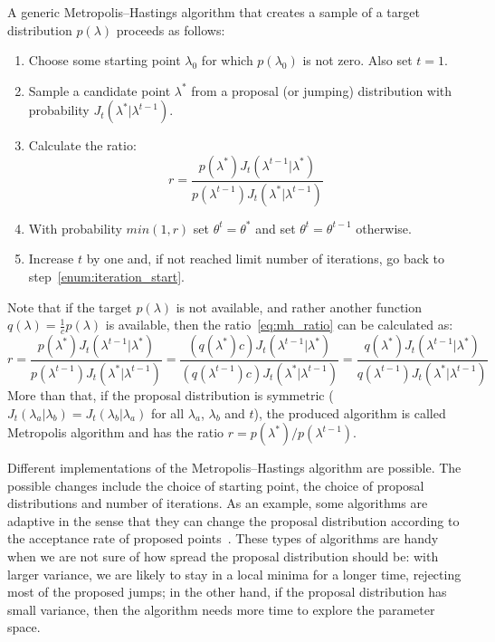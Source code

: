 A generic Metropolis--Hastings algorithm that creates a sample of a 
target distribution $p (\lambda)$ proceeds as follows:
\begin{enumerate}
\item{Choose some starting point $\lambda_0$ for which $p (\lambda_0)$ 
    is not zero. Also set $t = 1$.}
\item{Sample a candidate point $\lambda^*$ from a proposal (or jumping) 
    distribution with probability $J_t (\lambda^* | \lambda^{t - 1})$.}
    \label{enum:iteration_start}
\item{Calculate the ratio:}
    \begin{equation}
        r = \frac{p (\lambda^*) J_t (\lambda^{t - 1} | \lambda^*)}
                 {p (\lambda^{t - 1}) J_t (\lambda^* | \lambda^{t - 1})}
        \label{eq:mh_ratio}
    \end{equation}
\item{With probability $min (1, r)$ set $\theta^t = \theta^*$ and set
    $\theta^t = \theta^{t - 1}$ otherwise.}
\item{Increase $t$ by one and, if not reached limit number of 
    iterations, go back to step~\ref{enum:iteration_start}.}
\end{enumerate}
Note that if the target $p (\lambda)$ is not available, and rather 
another function $q (\lambda) = \frac{1}{c}p(\lambda)$ is available, 
then the ratio~\ref{eq:mh_ratio} can be calculated as:
\begin{equation*}
    r = \frac{p (\lambda^*) J_t (\lambda^{t - 1} | \lambda^*)}
              {p (\lambda^{t - 1}) J_t (\lambda^* | \lambda^{t - 1})} 
      = \frac{(q (\lambda^*)c) J_t (\lambda^{t - 1} | \lambda^*)}
           {(q (\lambda^{t - 1})c) J_t (\lambda^* | \lambda^{t - 1})} 
      = \frac{q (\lambda^*) J_t (\lambda^{t - 1} | \lambda^*)}
              {q (\lambda^{t - 1}) J_t (\lambda^* | \lambda^{t - 1})}
\end{equation*}
More than that, if the proposal distribution is symmetric 
($J_t(\lambda_a|\lambda_b) = J_t(\lambda_b|\lambda_a)$ for all 
$\lambda_a$, $\lambda_b$ and $t$), the produced algorithm is called 
Metropolis algorithm and has the ratio 
$r = {p (\lambda^*)}/{p (\lambda^{t - 1})}$. 

Different implementations of the Metropolis--Hastings algorithm are 
possible. The possible changes include the choice of starting point,
the choice of proposal distributions and number of iterations. As an
example, some algorithms are adaptive in the sense that they can change 
the proposal distribution according to the acceptance rate of proposed 
points~\cite{Gelman2013}. These types of algorithms are handy when we
are not sure of how spread the proposal distribution should be: with
larger variance, we are likely to stay in a local minima for a longer 
time, rejecting most of the proposed jumps; in the other hand, if the 
proposal distribution has small variance, then the algorithm needs more
time to explore the parameter space.

